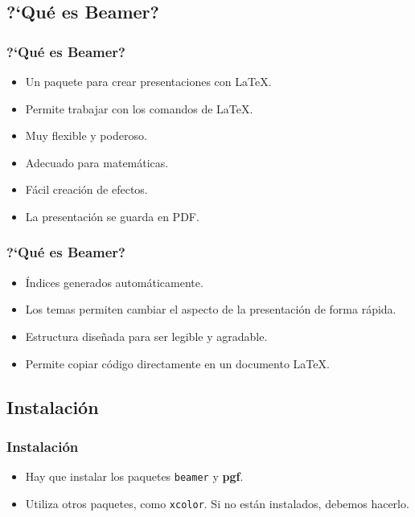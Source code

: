 \documentclass[aspectratio=43]{beamer}%
\begin{document}
\subsection{?`Qué es Beamer?}
\begin{frame}[fragile]
\frametitle{\textbf{?`Qué es Beamer?}}
\justifying
 \begin{itemize}\justifying
  \item Un paquete para crear presentaciones con \LaTeX{}.
  \item Permite trabajar con los comandos de \LaTeX{}.
  \item Muy flexible y poderoso.
  \item Adecuado para matemáticas.
  \item Fácil creación de efectos.
  \item La presentación se guarda en PDF.
\end{itemize}

\end{frame}

\begin{frame}[fragile]
\frametitle{\textbf{?`Qué es Beamer?}}
\justifying
 \begin{itemize}\justifying
  \item Índices generados automáticamente.
  \item Los temas permiten cambiar el aspecto de la presentación de forma rápida.
  \item Estructura diseñada para ser legible y agradable.
  \item Permite copiar código directamente en un documento \LaTeX{}.
\end{itemize}

\end{frame}
\subsection{Instalación}
\begin{frame}[fragile]
\frametitle{\textbf{Instalación}}
\justifying
 \begin{itemize}\justifying
  \item Hay que instalar los paquetes \texttt{beamer} y \textbf{pgf}.
  \item Utiliza otros paquetes, como \texttt{xcolor}. Si no están instalados, debemos hacerlo.
\end{itemize}
\end{frame}
\end{document}

